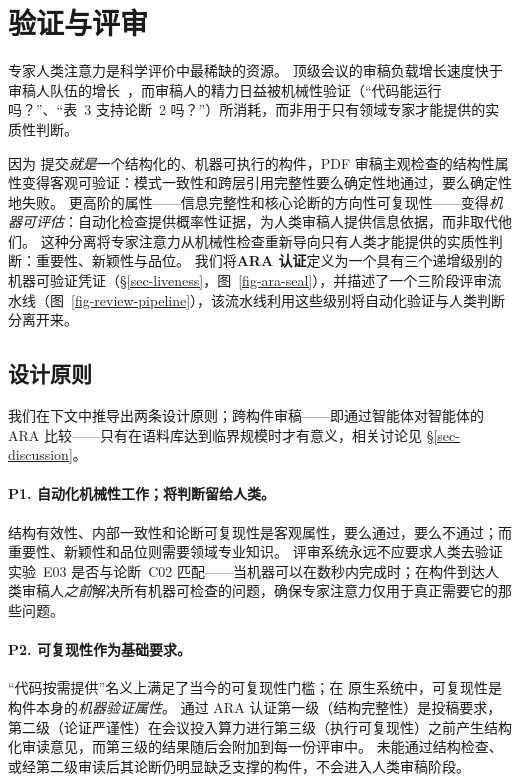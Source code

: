 \section{\ara{} 验证与评审}
\label{sec-review-system}

专家人类注意力是科学评价中最稀缺的资源。
顶级会议的审稿负载增长速度快于审稿人队伍的增长~\citep{aczel2021billiondollar}，而审稿人的精力日益被机械性验证（``代码能运行吗？''、``表~3 支持论断~2 吗？''）所消耗，而非用于只有领域专家才能提供的实质性判断。

因为 \ara{} 提交\emph{就是}一个结构化的、机器可执行的构件，PDF 审稿主观检查的结构性属性变得客观可验证：模式一致性和跨层引用完整性要么确定性地通过，要么确定性地失败。
更高阶的属性——信息完整性和核心论断的方向性可复现性——变得\emph{机器可评估}：自动化检查提供概率性证据，为人类审稿人提供信息依据，而非取代他们。
这种分离将专家注意力从机械性检查重新导向只有人类才能提供的实质性判断：重要性、新颖性与品位。
我们将\textbf{ARA 认证}定义为一个具有三个递增级别的机器可验证凭证（\S\ref{sec-liveness}，图~\ref{fig-ara-seal}），并描述了一个三阶段评审流水线（图~\ref{fig-review-pipeline}），该流水线利用这些级别将自动化验证与人类判断分离开来。

\subsection{设计原则}
\label{sec-review-principles}

我们在下文中推导出两条设计原则；跨构件审稿——即通过智能体对智能体的 ARA 比较——只有在语料库达到临界规模时才有意义，相关讨论见 \S\ref{sec-discussion}。

\paragraph{P1. 自动化机械性工作；将判断留给人类。}
结构有效性、内部一致性和论断可复现性是客观属性，要么通过，要么不通过；而重要性、新颖性和品位则需要领域专业知识。
评审系统永远不应要求人类去验证实验~E03 是否与论断~C02 匹配——当机器可以在数秒内完成时；在构件到达人类审稿人\emph{之前}解决所有机器可检查的问题，确保专家注意力仅用于真正需要它的那些问题。

\paragraph{P2. 可复现性作为基础要求。}
``代码按需提供''名义上满足了当今的可复现性门槛；在 \ara{} 原生系统中，可复现性是构件本身的\emph{机器验证属性}。
通过 ARA 认证第一级（结构完整性）是投稿要求，第二级（论证严谨性）在会议投入算力进行第三级（执行可复现性）之前产生结构化审读意见，而第三级的结果随后会附加到每一份评审中。
未能通过结构检查、或经第二级审读后其论断仍明显缺乏支撑的构件，不会进入人类审稿阶段。


